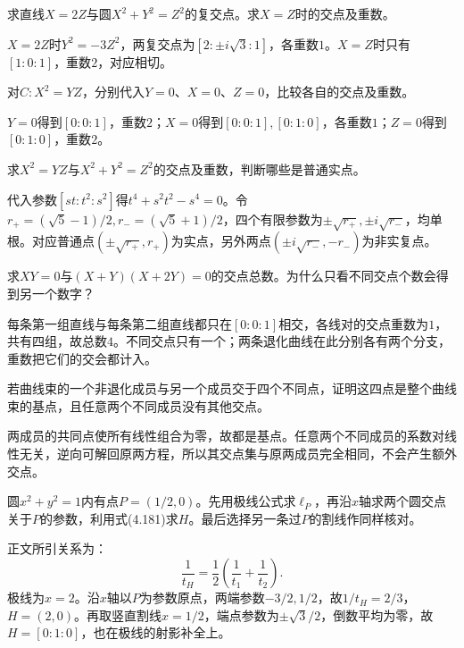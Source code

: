 求直线\(X=2Z\)与圆\(X^2+Y^2=Z^2\)的复交点。求\(X=Z\)时的交点及重数。
\par
\solutionanswer
\(X=2Z\)时\(Y^2=-3Z^2\)，两复交点为\([2:\pm i\sqrt3:1]\)，各重数\(1\)。\(X=Z\)时只有\([1:0:1]\)，重数\(2\)，对应相切。


对\(C:X^2=YZ\)，分别代入\(Y=0\)、\(X=0\)、\(Z=0\)，比较各自的交点及重数。
\par
\solutionanswer
\(Y=0\)得到\([0:0:1]\)，重数\(2\)；\(X=0\)得到\([0:0:1],[0:1:0]\)，各重数\(1\)；\(Z=0\)得到\([0:1:0]\)，重数\(2\)。


求\(X^2=YZ\)与\(X^2+Y^2=Z^2\)的交点及重数，判断哪些是普通实点。
\par
\solutionanswer
代入参数\([st:t^2:s^2]\)得\(t^4+s^2t^2-s^4=0\)。令\(r_+=(\sqrt5-1)/2,r_-=(\sqrt5+1)/2\)，四个有限参数为\(\pm\sqrt{r_+},\pm i\sqrt{r_-}\)，均单根。对应普通点\((\pm\sqrt{r_+},r_+)\)为实点，另外两点\((\pm i\sqrt{r_-},-r_-)\)为非实复点。


求\(XY=0\)与\((X+Y)(X+2Y)=0\)的交点总数。为什么只看不同交点个数会得到另一个数字？
\par
\solutionanswer
每条第一组直线与每条第二组直线都只在\([0:0:1]\)相交，各线对的交点重数为\(1\)，共有四组，故总数\(4\)。不同交点只有一个；两条退化曲线在此分别各有两个分支，重数把它们的交会都计入。


若曲线束的一个非退化成员与另一个成员交于四个不同点，证明这四点是整个曲线束的基点，且任意两个不同成员没有其他交点。
\par
\solutionanswer
两成员的共同点使所有线性组合为零，故都是基点。任意两个不同成员的系数对线性无关，逆向可解回原两方程，所以其交点集与原两成员完全相同，不会产生额外交点。


圆\(x^2+y^2=1\)内有点\(P=(1/2,0)\)。先用极线公式求\(\ell_P\)，再沿\(x\)轴求两个圆交点关于\(P\)的参数，利用式\textup{(4.181)}求\(H\)。最后选择另一条过\(P\)的割线作同样核对。

\par\smallskip\noindent 正文所引关系为：
\begin{equation*}
\frac1{t_H}=\frac12\left(\frac1{t_1}+\frac1{t_2}\right).
\end{equation*}
\solutionanswer
极线为\(x=2\)。沿\(x\)轴以\(P\)为参数原点，两端参数\(-3/2,1/2\)，故\(1/t_H=2/3\)，\(H=(2,0)\)。再取竖直割线\(x=1/2\)，端点参数为\(\pm\sqrt3/2\)，倒数平均为零，故\(H=[0:1:0]\)，也在极线的射影补全上。


